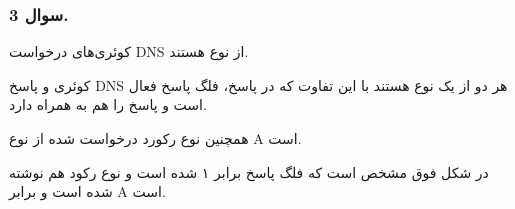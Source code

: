 \subsubsection*{سوال 3.}

{
}

کوئری‌های درخواست DNS از نوع
هستند.

کوئری و پاسخ DNS هر دو از یک نوع هستند با این تفاوت که در پاسخ،
فلگ پاسخ فعال است و پاسخ را هم به همراه دارد.

همچنین نوع رکورد درخواست شده از نوع A است.

{
}

در شکل فوق مشخص است که فلگ پاسخ برابر ۱ شده است و نوع رکود هم نوشته شده است و برابر A است.

